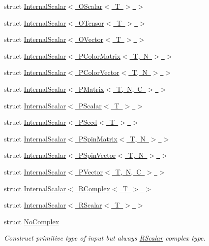 \begin{DoxyCompactItemize}
\item 
struct \mbox{\hyperlink{structENSEM_1_1InternalScalar_3_01OScalar_3_01T_01_4_01_4}{Internal\+Scalar$<$ O\+Scalar$<$ T $>$ $>$}}
\item 
struct \mbox{\hyperlink{structENSEM_1_1InternalScalar_3_01OTensor_3_01T_01_4_01_4}{Internal\+Scalar$<$ O\+Tensor$<$ T $>$ $>$}}
\item 
struct \mbox{\hyperlink{structENSEM_1_1InternalScalar_3_01OVector_3_01T_01_4_01_4}{Internal\+Scalar$<$ O\+Vector$<$ T $>$ $>$}}
\item 
struct \mbox{\hyperlink{structENSEM_1_1InternalScalar_3_01PColorMatrix_3_01T_00_01N_01_4_01_4}{Internal\+Scalar$<$ P\+Color\+Matrix$<$ T, N $>$ $>$}}
\item 
struct \mbox{\hyperlink{structENSEM_1_1InternalScalar_3_01PColorVector_3_01T_00_01N_01_4_01_4}{Internal\+Scalar$<$ P\+Color\+Vector$<$ T, N $>$ $>$}}
\item 
struct \mbox{\hyperlink{structENSEM_1_1InternalScalar_3_01PMatrix_3_01T_00_01N_00_01C_01_4_01_4}{Internal\+Scalar$<$ P\+Matrix$<$ T, N, C $>$ $>$}}
\item 
struct \mbox{\hyperlink{structENSEM_1_1InternalScalar_3_01PScalar_3_01T_01_4_01_4}{Internal\+Scalar$<$ P\+Scalar$<$ T $>$ $>$}}
\item 
struct \mbox{\hyperlink{structENSEM_1_1InternalScalar_3_01PSeed_3_01T_01_4_01_4}{Internal\+Scalar$<$ P\+Seed$<$ T $>$ $>$}}
\item 
struct \mbox{\hyperlink{structENSEM_1_1InternalScalar_3_01PSpinMatrix_3_01T_00_01N_01_4_01_4}{Internal\+Scalar$<$ P\+Spin\+Matrix$<$ T, N $>$ $>$}}
\item 
struct \mbox{\hyperlink{structENSEM_1_1InternalScalar_3_01PSpinVector_3_01T_00_01N_01_4_01_4}{Internal\+Scalar$<$ P\+Spin\+Vector$<$ T, N $>$ $>$}}
\item 
struct \mbox{\hyperlink{structENSEM_1_1InternalScalar_3_01PVector_3_01T_00_01N_00_01C_01_4_01_4}{Internal\+Scalar$<$ P\+Vector$<$ T, N, C $>$ $>$}}
\item 
struct \mbox{\hyperlink{structENSEM_1_1InternalScalar_3_01RComplex_3_01T_01_4_01_4}{Internal\+Scalar$<$ R\+Complex$<$ T $>$ $>$}}
\item 
struct \mbox{\hyperlink{structENSEM_1_1InternalScalar_3_01RScalar_3_01T_01_4_01_4}{Internal\+Scalar$<$ R\+Scalar$<$ T $>$ $>$}}
\item 
struct \mbox{\hyperlink{structENSEM_1_1NoComplex}{No\+Complex}}
\begin{DoxyCompactList}\small\item\em Construct primitive type of input but always \mbox{\hyperlink{classENSEM_1_1RScalar}{R\+Scalar}} complex type. \end{DoxyCompactList}\item 

\end{DoxyCompactItemize}
